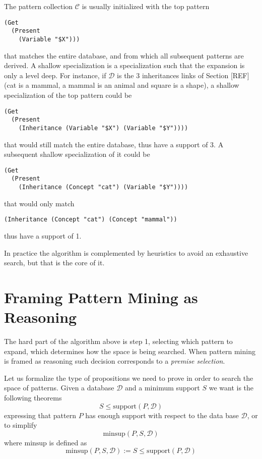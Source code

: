 \documentclass[runningheads]{llncs}
\begin{document}
The pattern collection $\mathcal{C}$ is usually initialized with the
top pattern
\begin{verbatim}
(Get
  (Present
    (Variable "$X")))
\end{verbatim}
that matches the entire database, and from which all subsequent
patterns are derived. A shallow specialization is a specialization
such that the expansion is only a level deep. For instance, if
$\mathcal{D}$ is the 3 inheritances links of Section [REF] (cat is a
mammal, a mammal is an animal and square is a shape), a shallow
specialization of the top pattern could be
\begin{verbatim}
(Get
  (Present
    (Inheritance (Variable "$X") (Variable "$Y"))))
\end{verbatim}
that would still match the entire database, thus have a support of
3. A subsequent shallow specialization of it could be
\begin{verbatim}
(Get
  (Present
    (Inheritance (Concept "cat") (Variable "$Y"))))
\end{verbatim}
that would only match
\begin{verbatim}
(Inheritance (Concept "cat") (Concept "mammal"))
\end{verbatim}
thus have a support of 1.

In practice the algorithm is complemented by heuristics to avoid an
exhaustive search, but that is the core of it.

\section{Framing Pattern Mining as Reasoning}

The hard part of the algorithm above is step 1, selecting which
pattern to expand, which determines how the space is being
searched. When pattern mining is framed as reasoning such decision
corresponds to a \emph{premise selection}.

Let us formalize the type of propositions we need to prove in order to
search the space of patterns. Given a database $\mathcal{D}$ and a
minimum support $S$ we want is the following theorems
$$ S \le \text{support}(P, \mathcal{D}) $$ expressing that pattern $P$
has enough support with respect to the data base $\mathcal{D}$, or to
simplify
$$ \text{minsup}(P, S, \mathcal{D}) $$ where $\text{minsup}$ is
defined as
$$ \text{minsup}(P, S, \mathcal{D}) := S \le \text{support}(P,
\mathcal{D}) $$
\end{document}

